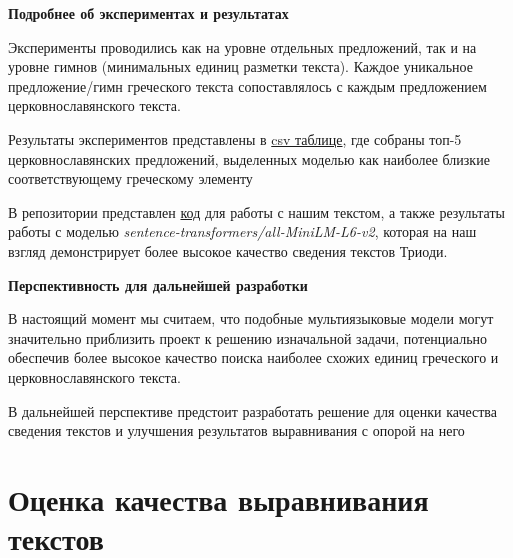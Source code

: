 \documentclass[
  letterpaper,
]{book}
\begin{document}
\begin{tcolorbox}[enhanced jigsaw, rightrule=.15mm, breakable, colframe=quarto-callout-note-color-frame, colback=white, leftrule=.75mm, left=2mm, arc=.35mm, opacityback=0, toprule=.15mm, bottomrule=.15mm]

\textbf{Подробнее об экспериментах и результатах}\vspace{2mm}

Эксперименты проводились как на уровне отдельных предложений, так и на
уровне гимнов (минимальных единиц разметки текста). Каждое уникальное
предложение/гимн греческого текста сопоставлялось с каждым предложением
церковнославянского текста.

Результаты экспериментов представлены в
\href{https://github.com/Drozhzhinastya/GSPC/tree/main/csv/sbert}{csv
таблице}, где собраны топ-5 церковнославянских предложений, выделенных
моделью как наиболее близкие соответствующему греческому элементу

\end{tcolorbox}

В репозитории представлен
\href{https://github.com/Drozhzhinastya/GSPC/blob/main/scripts/text-similarity/GSPC_sbert.ipynb}{код}
для работы с нашим текстом, а также результаты работы с моделью
\emph{sentence-transformers/all-MiniLM-L6-v2}, которая на наш взгляд
демонстрирует более высокое качество сведения текстов Триоди.

\begin{tcolorbox}[enhanced jigsaw, rightrule=.15mm, breakable, colframe=quarto-callout-tip-color-frame, colback=white, leftrule=.75mm, left=2mm, arc=.35mm, opacityback=0, toprule=.15mm, bottomrule=.15mm]

\textbf{Перспективность для дальнейшей разработки}\vspace{2mm}

В настоящий момент мы считаем, что подобные мультиязыковые модели могут
значительно приблизить проект к решению изначальной задачи, потенциально
обеспечив более высокое качество поиска наиболее схожих единиц
греческого и церковнославянского текста.

В дальнейшей перспективе предстоит разработать решение для оценки
качества сведения текстов и улучшения результатов выравнивания с опорой
на него

\end{tcolorbox}


\hypertarget{sec-about_evluation}{%
\chapter{Оценка качества выравнивания
текстов}\label{sec-about_evluation}}
\end{document}

